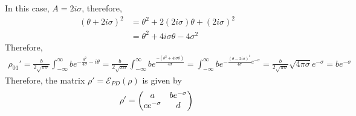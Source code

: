 In this case, $A = 2 i \sigma$, therefore, 
\begin{align}
    (\theta + 2i\sigma)^2 &= \theta ^2 + 2 ( 2 i \sigma) \theta + ( 2 i \sigma)^2 \\
    &= \theta^2 + 4 i \sigma \theta - 4\sigma^2
\end{align}
Therefore, 
\begin{align}
    \rho_{01}'  = \frac{b }{2\sqrt{\pi \sigma}} \int_{-\infty}^{\infty} b e^{-\frac{\theta^2}{4\sigma} - i \theta} =  \frac{b }{2\sqrt{\pi \sigma}} \int_{-\infty}^{\infty} b e^{\frac{-(\theta^2 + 4i\sigma\theta) }
    {4\sigma}} = \int_{-\infty}^{\infty} b e^{ -\frac{(\theta -2 i\sigma)^2}{4\sigma} e^ {-\sigma}}  = \frac{b}{2\sqrt{\pi \sigma}} \sqrt{4\pi\sigma}e^{-\sigma} = b e^{-\sigma}  
\end{align}
Therefore, the matrix $\rho' = \mathcal{E}_{PD}(\rho)$ is given by
\begin{equation}
    \rho' = \begin{pmatrix} a & b e^{-\sigma} \\ ce^{-\sigma} & d \end{pmatrix} \\
\end{equation}



\newpage
